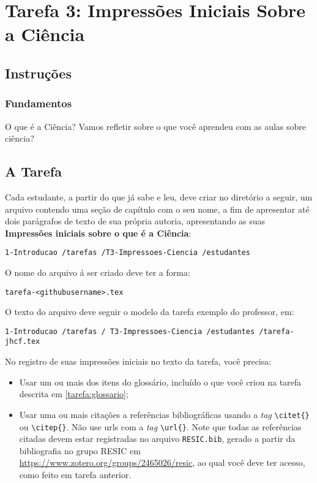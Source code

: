 \chapter{Tarefa 3: Impressões Iniciais Sobre a Ciência}

\section{Instruções}

\subsection{Fundamentos}

O que é a Ciência? Vamos refletir sobre o que você aprendeu com as aulas sobre ciência?

\section{A Tarefa}

Cada estudante, a partir do que já sabe e leu, deve criar no diretório a seguir, um arquivo contendo uma seção de capítulo com o seu nome, a fim de apresentar até dois parágrafos de texto de sua própria autoria, apresentando as suas \textbf{Impressões iniciais sobre o que é a Ciência}:
\begin{verbatim}
1-Introducao /tarefas /T3-Impressoes-Ciencia /estudantes    
\end{verbatim}

O nome do arquivo á ser criado deve ter a forma:

\begin{verbatim}
tarefa-<githubusername>.tex
\end{verbatim}

O texto do arquivo deve seguir o modelo da tarefa exemplo do professor, em:
\begin{verbatim}
1-Introducao /tarefas / T3-Impressoes-Ciencia /estudantes /tarefa-jhcf.tex
\end{verbatim}

No registro de suas impressões iniciais no texto da tarefa, você precisa:
\begin{itemize}
    \item Usar um ou mais dos itens do glossário, incluído o que você criou na tarefa descrita em \ref{tarefa:glossario};
    \item Usar uma ou mais citações a referências bibliográficas usando a \textit{tag} \verb|\citet{}| ou \verb|\citep{}|. Não use urls com a \textit{tag} \verb|\url{}|. Note que todas as referências citadas devem estar registradas no arquivo \verb|RESIC.bib|, gerado a partir da bibliografia no grupo RESIC em \url{https://www.zotero.org/groups/2465026/resic}, ao qual você deve ter acesso, como feito em tarefa anterior.
\end{itemize}

